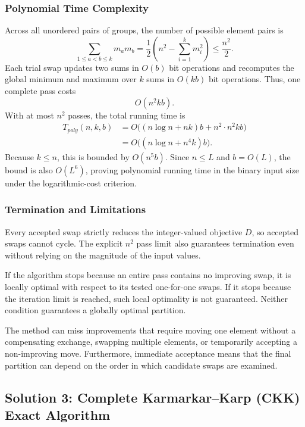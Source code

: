 \documentclass[11pt,a4paper]{article}
\begin{document}
\subsubsection{Polynomial Time Complexity}
Across all unordered pairs of groups, the number of possible element pairs is
\begin{equation}
\sum_{1\le a<b\le k}m_am_b=\frac12\left(n^2-\sum_{i=1}^{k}m_i^2\right)\le\frac{n^2}{2}.
\end{equation}
Each trial swap updates two sums in $O(b)$ bit operations and recomputes the global minimum and maximum over $k$ sums in $O(kb)$ bit operations. Thus, one complete pass costs
\begin{equation}O(n^2kb).\end{equation}
With at most $n^2$ passes, the total running time is
\begin{align}
T_{poly}(n,k,b)&=O\bigl((n\log n+nk)b+n^2\cdot n^2kb\bigr)\\
&=O\bigl((n\log n+n^4k)b\bigr).
\end{align}
Because $k\le n$, this is bounded by $O(n^5b)$. Since $n\le L$ and $b=O(L)$, the bound is also $O(L^6)$, proving polynomial running time in the binary input size under the logarithmic-cost criterion.

\subsubsection{Termination and Limitations}
Every accepted swap strictly reduces the integer-valued objective $D$, so accepted swaps cannot cycle. The explicit $n^2$ pass limit also guarantees termination even without relying on the magnitude of the input values.

If the algorithm stops because an entire pass contains no improving swap, it is locally optimal with respect to its tested one-for-one swaps. If it stops because the iteration limit is reached, such local optimality is not guaranteed. Neither condition guarantees a globally optimal partition.

The method can miss improvements that require moving one element without a compensating exchange, swapping multiple elements, or temporarily accepting a non-improving move. Furthermore, immediate acceptance means that the final partition can depend on the order in which candidate swaps are examined.

\subsection{Solution 3: Complete Karmarkar--Karp (CKK) Exact Algorithm}
\end{document}
